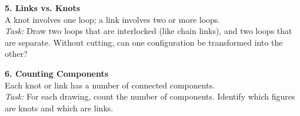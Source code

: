 {\vspace{1em}

\textbf{5. Links vs. Knots} \\[0.5em]
A knot involves one loop; a link involves two or more loops. \\
\emph{Task:} Draw two loops that are interlocked (like chain links), and two loops that are separate. Without cutting, can one configuration be transformed into the other?

\vspace{1em}

\textbf{6. Counting Components} \\[0.5em]
Each knot or link has a number of connected components. \\
\emph{Task:} For each drawing, count the number of components. Identify which figures are knots and which are links.
}
